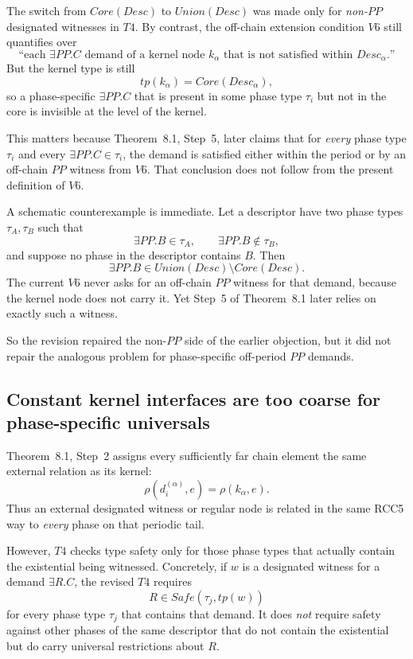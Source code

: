 \documentclass[11pt]{article}
\begin{document}
The switch from $Core(Desc)$ to $Union(Desc)$ was made only for \emph{non-$PP$} designated witnesses in $T4$. By contrast, the off-chain extension condition $V6$ still quantifies over
\[
\text{``each } \exists PP.C \text{ demand of a kernel node } k_\alpha \text{ that is not satisfied within } Desc_\alpha \text{.''}
\]
But the kernel type is still
\[
 tp(k_\alpha)=Core(Desc_\alpha),
\]
so a phase-specific $\exists PP.C$ that is present in some phase type $\tau_i$ but not in the core is invisible at the level of the kernel.

This matters because Theorem~8.1, Step~5, later claims that for \emph{every} phase type $\tau_i$ and every $\exists PP.C \in \tau_i$, the demand is satisfied either within the period or by an off-chain $PP$ witness from $V6$. That conclusion does not follow from the present definition of $V6$.

A schematic counterexample is immediate. Let a descriptor have two phase types $\tau_A,\tau_B$ such that
\[
\exists PP.B \in \tau_A, \qquad \exists PP.B \notin \tau_B,
\]
and suppose no phase in the descriptor contains $B$. Then
\[
\exists PP.B \in Union(Desc) \setminus Core(Desc).
\]
The current $V6$ never asks for an off-chain $PP$ witness for that demand, because the kernel node does not carry it. Yet Step~5 of Theorem~8.1 later relies on exactly such a witness.

So the revision repaired the non-$PP$ side of the earlier objection, but it did not repair the analogous problem for phase-specific off-period $PP$ demands.

\subsection{Constant kernel interfaces are too coarse for phase-specific universals}

Theorem~8.1, Step~2 assigns every sufficiently far chain element the same external relation as its kernel:
\[
\rho(d_i^{(\alpha)},e)=\rho(k_\alpha,e).
\]
Thus an external designated witness or regular node is related in the same RCC5 way to \emph{every} phase on that periodic tail.

However, $T4$ checks type safety only for those phase types that actually contain the existential being witnessed. Concretely, if $w$ is a designated witness for a demand $\exists R.C$, the revised $T4$ requires
\[
R \in Safe(\tau_j,tp(w))
\]
for every phase type $\tau_j$ that contains that demand. It does \emph{not} require safety against other phases of the same descriptor that do not contain the existential but do carry universal restrictions about $R$.
\end{document}
